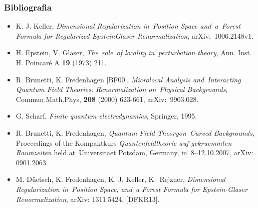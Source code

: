 \documentclass[10pt,t]{beamer}
\begin{document}
\begin{frame}
  \frametitle{Bibliografia}


  \begin{itemize}
    \RaggedRight

  \item K. J. Keller, \textit{Dimensional Regularization in~Position
      Space and~a~Forest Formula for Regularized Epstein\dywiz Glaser
      Renormalization}, arXiv:~1006.2148v1.

  \item H. Epstein, V. Glaser, \textit{The~role~of locality
      in~perturbation theory}, Ann. Inst. H. Poincar\'{e} A
    \textbf{19} (1973) 211.

  \item R. Brunetti, K. Fredenhagen [BF00], \textit{Microlocal
      Analysis and~Interacting Quantum Field Theories: Renormalization
      on~Physical Backgrounds}, Commun.Math.Phys, \textbf{208} (2000)
    623-661, arXiv:~9903.028.

  \item G. Scharf, \textit{Finite quantum electrodynamics}, Springer,
    1995.

  \item R. Brunetti, K. Fredenhagen, \textit{Quantum Field
      Theory\linebreak on~Curved Backgrounds}, Proceedings of the
    Kompaktkurs \emph{Quantenfeldtheorie auf gekruemmten
      Raumzeiten}
    held at~Universitaet Potsdam, Germany, in~8--12.10.2007,
    arXiv:
    0901.2063.

  \item M. D\"{u}etsch, K. Fredenhagen, K. J.
    Keller, K.~Rejzner, \textit{Dimensional Regularization in~Position
      Space, and~a Forest Formula for Epstein-Glaser Renormalization},
    arXiv: 1311.5424, [DFKR13].

  \end{itemize}

\end{frame}











\printbibliography





\end{document}
